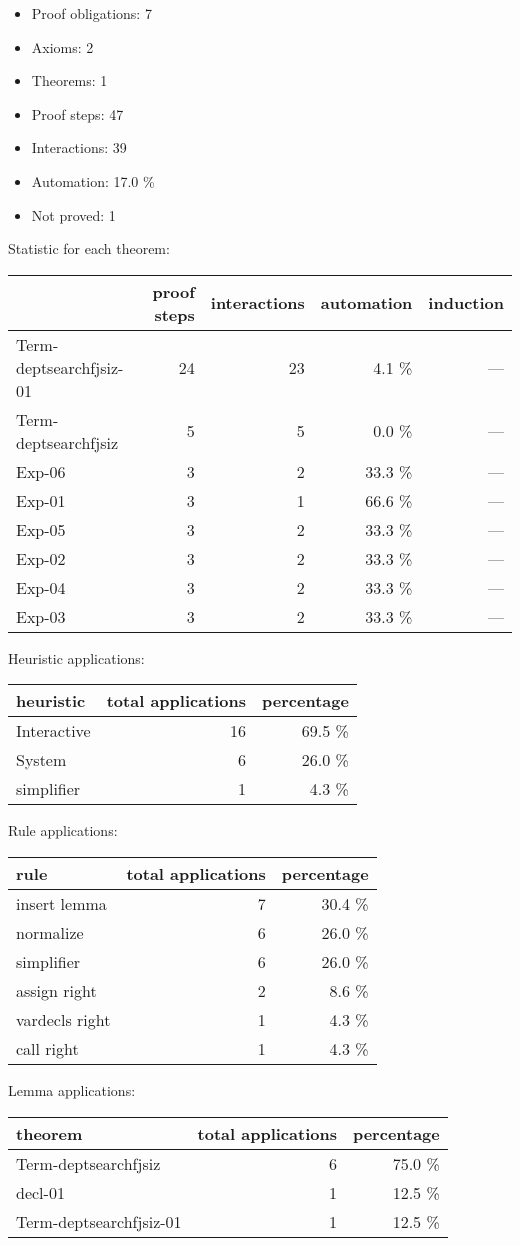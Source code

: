 \documentclass[a4paper]{article}
\begin{document}
\raggedright
              
\begin{itemize}
\item Proof obligations: 7
\item Axioms: 2
\item Theorems: 1
\item Proof steps: 47
\item Interactions: 39
\item Automation: 17.0 \%
\item Not proved: 1
\end{itemize}


Statistic for each theorem:

\begin{supertabular}{l|r|r|r|r}
	& proof steps & interactions & automation & induction\\ \hline
Term-deptsearchfjsiz-01 & 24 & 23 & 4.1 \% & ---\\
Term-deptsearchfjsiz & 5 & 5 & 0.0 \% & ---\\
Exp-06 & 3 & 2 & 33.3 \% & ---\\
Exp-01 & 3 & 1 & 66.6 \% & ---\\
Exp-05 & 3 & 2 & 33.3 \% & ---\\
Exp-02 & 3 & 2 & 33.3 \% & ---\\
Exp-04 & 3 & 2 & 33.3 \% & ---\\
Exp-03 & 3 & 2 & 33.3 \% & ---\\

\end{supertabular}

Heuristic applications:

\begin{supertabular}{l|r|r}
heuristic	& total applications & percentage \\ \hline
Interactive & 16 & 69.5 \% \\
System & 6 & 26.0 \% \\
simplifier & 1 & 4.3 \% \\

\end{supertabular}

Rule applications:

\begin{supertabular}{l|r|r}
rule	        & total applications & percentage \\ \hline
insert lemma & 7 & 30.4 \% \\
normalize & 6 & 26.0 \% \\
simplifier & 6 & 26.0 \% \\
assign right & 2 & 8.6 \% \\
vardecls right & 1 & 4.3 \% \\
call right & 1 & 4.3 \% \\

\end{supertabular}

Lemma applications:

\begin{supertabular}{l|r|r}
theorem	        & total applications & percentage \\ \hline
Term-deptsearchfjsiz & 6 & 75.0 \% \\
decl-01 & 1 & 12.5 \% \\
Term-deptsearchfjsiz-01 & 1 & 12.5 \% \\

\end{supertabular}
\end{document}
